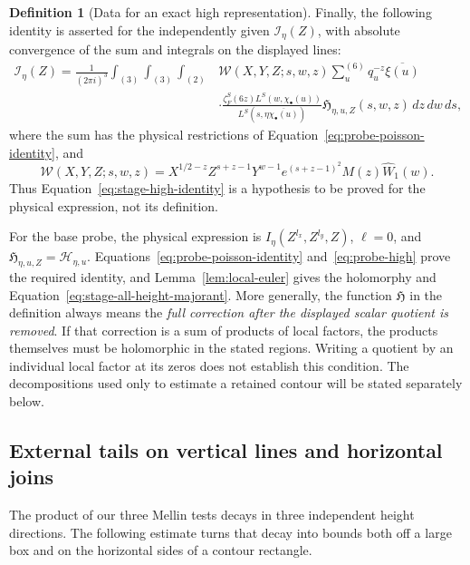 \documentclass[11pt,a4paper]{article}
\numberwithin{equation}{section}
\numberwithin{figure}{section}
\theoremstyle{definition}
\newtheorem{definition}[theorem]{Definition}
\theoremstyle{remark}
\begin{document}
\begin{definition}[Data for an exact high representation]
Finally, the following identity is asserted for the independently given
$\mathscr I_\eta(Z)$, with absolute convergence of the sum and integrals
on the displayed lines:
\begin{equation}
\begin{split}
 \mathscr I_\eta(Z)=\frac1{(2\pi i)^3}
 \int_{(3)}\int_{(3)}\int_{(2)}
 &\mathcal W(X,Y,Z;s,w,z)
 \sum_u^{(6)}q_u^{-z}\overline{\xi(u)}\\
 &\cdot
 \frac{\zeta_F^S(6z)L^S(w,\chi_\bullet(u))}
      {L^S(s,\eta\overline{\chi_\bullet(u)})}
 \mathfrak H_{\eta,u,Z}(s,w,z)\,dz\,dw\,ds,
\end{split}
\label{eq:stage-high-identity}
\end{equation}
where the sum has the physical restrictions of
Equation~\eqref{eq:probe-poisson-identity}, and
\[
 \mathcal W(X,Y,Z;s,w,z)
 =X^{1/2-z}Z^{s+z-1}Y^{w-1}
       e^{(s+z-1)^2}M(z)\widehat W_1(w).
\]
Thus Equation~\eqref{eq:stage-high-identity} is a hypothesis to be proved
for the physical expression, not its definition.
\end{definition}

For the base probe, the physical expression is
$I_\eta(Z^{l_x},Z^{l_y},Z)$, $\ell=0$, and
$\mathfrak H_{\eta,u,Z}=\mathcal H_{\eta,u}$.
Equations~\eqref{eq:probe-poisson-identity} and~\eqref{eq:probe-high}
prove the required identity, and Lemma~\ref{lem:local-euler} gives the
holomorphy and Equation~\eqref{eq:stage-all-height-majorant}.  More
generally, the function $\mathfrak H$ in the definition always means the
\emph{full correction after the displayed scalar quotient is removed}.
If that correction is a sum of products of local factors, the products
themselves must be holomorphic in the stated regions.  Writing a quotient
by an individual local factor at its zeros does not establish this
condition.  The decompositions used only to estimate a retained contour
will be stated separately below.

\subsection{External tails on vertical lines and horizontal joins}

The product of our three Mellin tests decays in three independent height
directions.  The following estimate turns that decay into bounds both off a
large box and on the horizontal sides of a contour rectangle.
\end{document}
